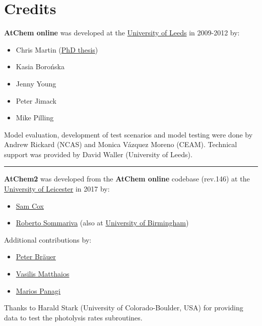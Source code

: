 \chapter{Credits} \label{ch:credits}

\textbf{AtChem online} was developed at the
\href{https://www.leeds.ac.uk}{University of Leeds} in 2009-2012 by:

\begin{itemize}
\item Chris Martin (\href{http://etheses.whiterose.ac.uk/1596/}{PhD thesis})
\item Kasia Boro{\'n}ska
\item Jenny Young
\item Peter Jimack
\item Mike Pilling
\end{itemize}

Model evaluation, development of test scenarios and model testing were
done by Andrew Rickard (NCAS) and Monica V{\'a}zquez Moreno (CEAM).
Technical support was provided by David Waller (University of Leeds).

\begin{center}\rule{0.5\linewidth}{\linethickness}\end{center}

\textbf{AtChem2} was developed from the \textbf{AtChem online} codebase
(rev.146) at the \href{https://le.ac.uk}{University of Leicester} in
2017 by:

\begin{itemize}
\item \href{https://github.com/spco}{Sam Cox}
\item \href{https://github.com/rs028}{Roberto Sommariva} (also at
  \href{https://www.birmingham.ac.uk}{University of Birmingham})
\end{itemize}

Additional contributions by:

\begin{itemize}
\item \href{https://github.com/pb866}{Peter Br{\"a}uer}
\item \href{https://github.com/kailas29}{Vasilis Matthaios}
\item \href{https://github.com/mpanagi}{Marios Panagi}
\end{itemize}

Thanks to Harald Stark (University of Colorado-Boulder, USA) for
providing data to test the photolysis rates subroutines.

